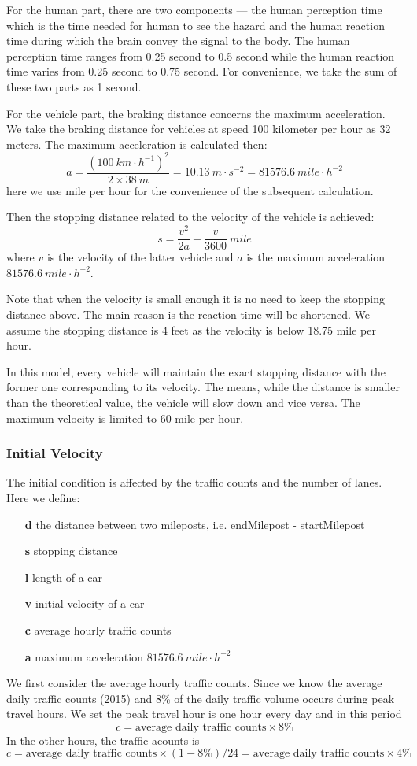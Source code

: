 \documentclass[a4paper]{article}
\begin{document}
	For the human part, there are two components — the human perception time which is the time needed for human to see the hazard and the human reaction time during which the brain convey the signal to the body. The human perception time ranges from 0.25 second to 0.5 second while the human reaction time varies from 0.25 second to 0.75 second.\cite{stopping} For convenience, we take the sum of these two parts as 1 second.

	For the vehicle part, the braking distance concerns the maximum acceleration. We take the braking distance for vehicles at speed 100 kilometer per hour as 32 meters. The maximum acceleration is calculated then:
	$$ a=\dfrac{(100\ km\cdot h^{-1})^2}{2\times 38\ m}=10.13\ m\cdot s^{-2}=81576.6\ mile\cdot h^{-2} $$
	here we use mile per hour for the convenience of the subsequent calculation.

	Then the stopping distance related to the velocity of the vehicle is achieved:
	$$ s=\dfrac{v^2}{2a}+\dfrac{v}{3600}\ mile $$
	where $ v $ is the velocity of the latter vehicle and $ a $ is the maximum acceleration $ 81576.6\ mile\cdot h^{-2} $.

	Note that when the velocity is small enough it is no need to keep the stopping distance above. The main reason is the reaction time will be shortened. We assume the stopping distance is 4 feet as the velocity is below 18.75 mile per hour.

	In this model, every vehicle will maintain the exact stopping distance with the former one corresponding to its velocity. The means, while the distance is smaller than the theoretical value, the vehicle will slow down and vice versa. The maximum velocity is limited to 60 mile per hour.

	\subsubsection{Initial Velocity}
	The initial condition is affected by the traffic counts and the number of lanes. Here we define:
	\begin{enumerate}
		\item [\textbf{d}] the distance between two mileposts, i.e. endMilepost - startMilepost
		\item [\textbf{s}] stopping distance
		\item [\textbf{l}] length of a car
		\item [\textbf{v}] initial velocity of a car
		\item [\textbf{c}] average hourly traffic counts
		\item [\textbf{a}] maximum acceleration $ 81576.6\ mile\cdot h^{-2} $
	\end{enumerate}
	We first consider the average hourly traffic counts. Since we know the average daily traffic counts (2015) and 8\% of the daily traffic volume occurs during peak travel hours. We set the peak travel hour is one hour every day and in this period $$ c=\text{average daily traffic counts}\times 8\% $$ In the other hours, the traffic acounts is  $$ c=\text{average daily traffic counts}\times (1-8\%)/24=\text{average daily traffic counts}\times 4\%  $$
\end{document}
